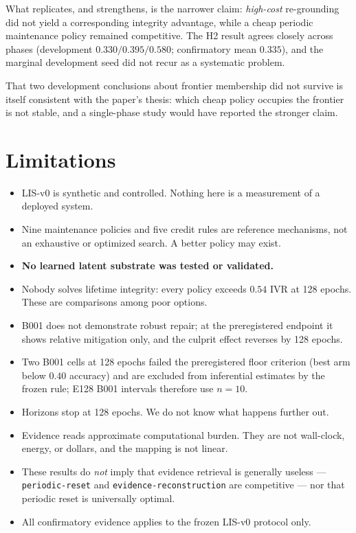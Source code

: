 \documentclass[11pt]{article}
\newcommand{\code}[1]{\texttt{\small #1}}
\begin{document}
What replicates, and strengthens, is the narrower claim: \emph{high-cost}
re-grounding did not yield a corresponding integrity advantage, while a cheap
periodic maintenance policy remained competitive. The H2 result agrees closely
across phases (development $0.330/0.395/0.580$; confirmatory mean $0.335$), and
the marginal development seed did not recur as a systematic problem.

That two development conclusions about frontier membership did not survive is
itself consistent with the paper's thesis: which cheap policy occupies the
frontier is not stable, and a single-phase study would have reported the stronger
claim.

\section{Limitations}
\label{sec:limits}

\begin{itemize}\itemsep1pt
\item LIS-v0 is synthetic and controlled. Nothing here is a measurement of a
      deployed system.
\item Nine maintenance policies and five credit rules are reference mechanisms,
      not an exhaustive or optimized search. A better policy may exist.
\item \textbf{No learned latent substrate was tested or validated.}
\item Nobody solves lifetime integrity: every policy exceeds $0.54$ IVR at 128
      epochs. These are comparisons among poor options.
\item B001 does not demonstrate robust repair; at the preregistered endpoint it
      shows relative mitigation only, and the culprit effect reverses by 128
      epochs.
\item Two B001 cells at 128 epochs failed the preregistered floor criterion
      (best arm below $0.40$ accuracy) and are excluded from inferential
      estimates by the frozen rule; E128 B001 intervals therefore use $n=10$.
\item Horizons stop at 128 epochs. We do not know what happens further out.
\item Evidence reads approximate computational burden. They are not wall-clock,
      energy, or dollars, and the mapping is not linear.
\item These results do \emph{not} imply that evidence retrieval is generally
      useless --- \code{periodic-reset} and \code{evidence-reconstruction} are
      competitive --- nor that periodic reset is universally optimal.
\item All confirmatory evidence applies to the frozen LIS-v0 protocol only.
\end{itemize}
\end{document}
